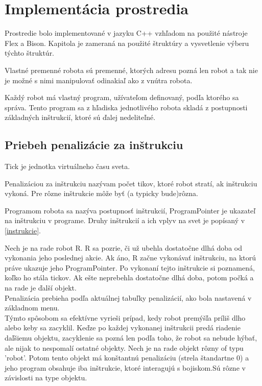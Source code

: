 \chapter{Implementácia prostredia}
Prostredie bolo implementované v jazyku C++ vzhľadom na použité nástroje Flex a Bison. Kapitola je zameraná na použité štruktúry a vysvetlenie výberu týchto štruktúr.
\begin{definicia}
Vlastné premenné robota sú premenné, ktorých adresu pozná len robot a tak nie je možné s nimi manipulovať odinakiaľ ako z vnútra robota.
\end{definicia}

Každý robot má vlastný program, užívateľom definovaný, podľa ktorého sa správa. Tento program sa z hľadiska jednotlivého robota skladá z postupnosti základných inštrukcií, ktoré sú ďalej nedeliteľné. 

\section{Priebeh penalizácie za inštrukciu}

\begin{definicia}
Tick je jednotka virtuálneho času sveta. 
\end{definicia}

\begin{definicia}
Penalizáciou za inštrukciu nazývam počet tikov, ktoré robot stratí, ak inštrukciu vykoná. Pre rôzne inštrukcie môže byť (a typicky bude)rôzna.
\end{definicia}

\begin{definicia}
Programom robota sa nazýva postupnosť inštrukcií, ProgramPointer je ukazateľ na inštrukciu v programe. Druhy inštrukcií a ich vplyv na svet je popísaný v \ref{instrukcie}.
\end{definicia}

Nech je na rade robot R. R sa pozrie, či už ubehla dostatočne dlhá doba od vykonania jeho poslednej akcie. Ak áno, R začne vykonávať inštrukciu, na ktorú práve ukazuje jeho ProgramPointer. Po vykonaní tejto inštrukcie si poznamená, koľko ho stála tickov. Ak ešte neprebehla dostatočne dlhá doba, potom počká a na rade je ďalší objekt. \\
Penalizácia prebieha podľa aktuálnej tabuľky penalizácií, ako bola nastavená v základnom menu. \\

Týmto spôsobom sa efektívne vyrieši prípad, kedy robot premýšľa príliš dlho alebo keby sa zacyklil. Keďze po každej vykonanej inštrukcii predá riadenie daľšiemu objektu, zacyklenie sa pozná len podľa toho, že robot sa nebude hýbať, ale nijak to nespomalí ostatné objekty.%
\newline
Nech je na rade objekt rôzny of typu 'robot'. Potom tento objekt má konštantnú penalizáciu (strela štandartne 0) a jeho program obsahuje iba inštrukcie, ktoré interagujú s bojiskom.Sú rôzne v závislosti na type objektu.

